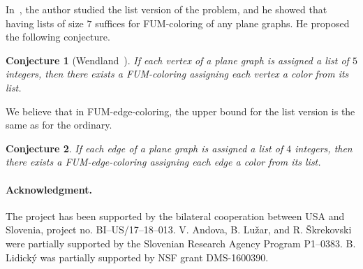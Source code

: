 \documentclass[a4paper,12pt]{article}
\newtheorem{conjecture}{Conjecture}
\begin{document}
In~\cite{Wen16}, the author studied the list version of the problem, and he showed that having lists of size $7$
suffices for FUM-coloring of any plane graphs. He proposed the following conjecture.
\begin{conjecture}[Wendland~\cite{Wen16}]
	If each vertex of a plane graph is assigned a list of $5$ integers, then there
	exists a FUM-coloring assigning each vertex a color from its list.
\end{conjecture}
We believe that in FUM-edge-coloring, the upper bound for the list version is the same as for the ordinary.
\begin{conjecture}
	If each edge of a plane graph is assigned a list of $4$ integers, then there
	exists a FUM-edge-coloring assigning each edge a color from its list.
\end{conjecture}

\paragraph{Acknowledgment.}

The project has been supported by the bilateral cooperation between USA and Slovenia, project no. BI--US/17--18--013.
V. Andova, B. Lu\v{z}ar, and R. \v{S}krekovski were partially supported by the Slovenian Research Agency Program P1--0383.
B. Lidick\'y was partially supported by NSF grant DMS-1600390.
\end{document}
